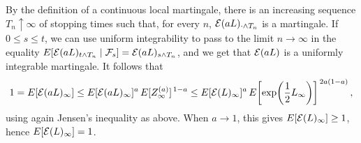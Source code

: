 \documentclass[../Main.tex]{subfiles}
\begin{document}
{By the definition of a continuous local martingale, there is an
increasing sequence \(T_n\uparrow\infty\) of stopping times such that,
for every \(n\), \(\mathcal{E}(aL)_{\cdot\wedge T_n}\) is a martingale. If
\(0\le s\le t\), we can use uniform integrability to pass to the limit
\(n\to\infty\) in the equality
\(E[\mathcal{E}(aL)_{t\wedge T_n}\mid\mathcal{F}_s]=\mathcal{E}(aL)_{s\wedge T_n}\), and we get
that \(\mathcal{E}(aL)\) is a uniformly integrable martingale. It follows that
\[
1 = E[\mathcal{E}(aL)_\infty]
  \le
  E[\mathcal{E}(aL)_\infty]^a
  \,E[Z^{(a)}_\infty]^{\,1-a}
  \le
  E[\mathcal{E}(L)_\infty]^a
  \,E\!\left[\exp\!\left(\frac12 L_\infty\right)\right]^{\,2a(1-a)},
\]
using again Jensen's inequality as above. When \(a\to1\), this gives
\(E[\mathcal{E}(L)_\infty]\ge1\), hence \(E[\mathcal{E}(L)_\infty]=1\).
}
\end{document}
